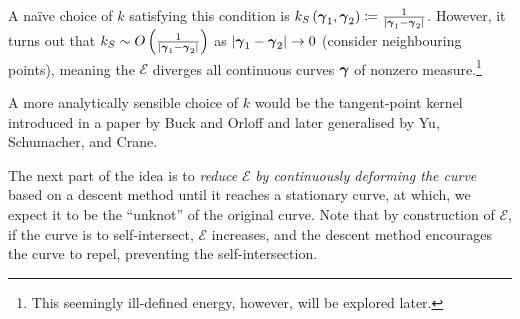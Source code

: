 \documentclass[../dissertation.tex]{subfiles}
\begin{document}
A na\"ive choice of $k$ satisfying this condition is $k_S \left( \boldsymbol{\gamma}_1, \boldsymbol{\gamma}_2 \right) \coloneqq \frac{1}{\lvert\boldsymbol{\gamma}_1 - \boldsymbol{\gamma}_2\lvert}$.
However, it turns out that $k_S \sim O\left( \frac{1}{\lvert\boldsymbol{\gamma}_1 - \boldsymbol{\gamma}_2\lvert} \right)$ as $\abs{\gammabf_1 - \gammabf_2} \rightarrow 0$ (consider neighbouring points), meaning the $\mathcal{E}$ diverges all continuous curves $\boldsymbol{\gamma}$ of nonzero measure.\footnote{This seemingly ill-defined energy, however, will be explored later.}

A more analytically sensible choice of $k$ would be the tangent-point kernel introduced in a paper by Buck and Orloff\cite{BO1995} and later generalised by Yu, Schumacher, and Crane\cite{YSC2021}.

The next part of the idea is to \emph{reduce} $\mathcal{E}$ \emph{by continuously deforming the curve} based on a descent method until it reaches a stationary curve, at which, we expect it to be the ``unknot'' of the original curve.
Note that by construction of $\mathcal{E}$, if the curve is to self-intersect, $\mathcal{E}$ increases, and the descent method encourages the curve to repel, preventing the self-intersection.
\end{document}
